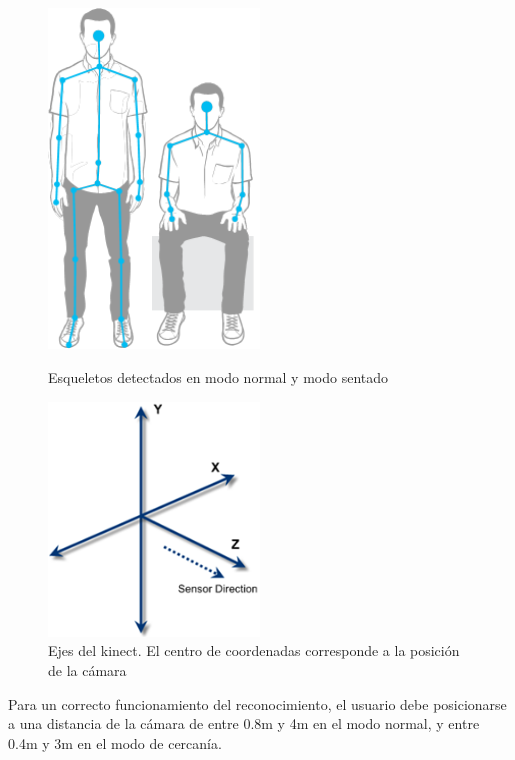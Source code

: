 \begin{figure}[ht]
\centering
\begin{minipage}[b]{0.3\linewidth}
\centering
\includegraphics[width=0.5\textwidth]{img/db/skeletons}
\caption{Esqueletos detectados en modo normal y modo sentado}
\label{fig:esqueletos}
\end{minipage}
\hspace{0.5cm}
\begin{minipage}[b]{0.40\linewidth}
\centering
\includegraphics[width=0.5\textwidth]{img/db/sensor-axes}
\caption{Ejes del kinect. El centro de coordenadas corresponde a la posición de la cámara}
\label{fig:ejeskinect}
\end{minipage}
\end{figure}



Para un correcto funcionamiento del reconocimiento, el usuario debe posicionarse a una distancia de la cámara de entre 0.8m y 4m en el modo normal, y entre 0.4m y 3m en el modo de cercanía. 

